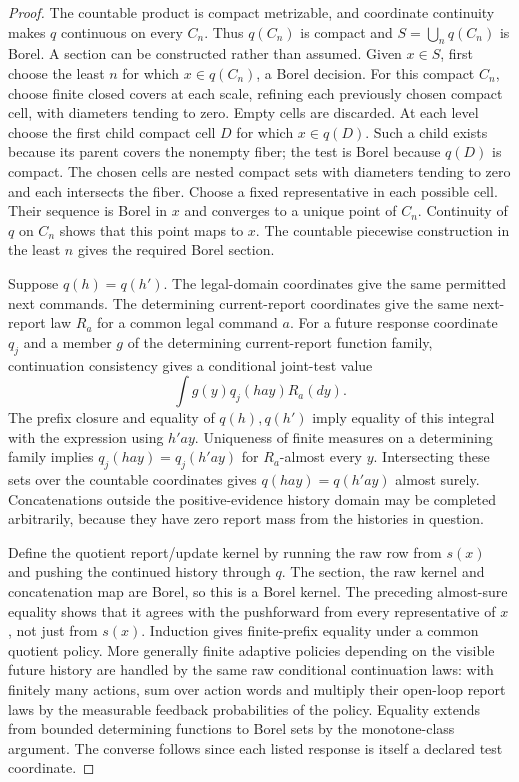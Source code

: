 \begin{proof}
The countable product is compact metrizable, and coordinate continuity makes $q$ continuous on every $C_n$. Thus $q(C_n)$ is compact and $S=\bigcup_nq(C_n)$ is Borel. A section can be constructed rather than assumed. Given $x\in S$, first choose the least $n$ for which $x\in q(C_n)$, a Borel decision. For this compact $C_n$, choose finite closed covers at each scale, refining each previously chosen compact cell, with diameters tending to zero. Empty cells are discarded. At each level choose the first child compact cell $D$ for which $x\in q(D)$. Such a child exists because its parent covers the nonempty fiber; the test is Borel because $q(D)$ is compact. The chosen cells are nested compact sets with diameters tending to zero and each intersects the fiber. Choose a fixed representative in each possible cell. Their sequence is Borel in $x$ and converges to a unique point of $C_n$. Continuity of $q$ on $C_n$ shows that this point maps to $x$. The countable piecewise construction in the least $n$ gives the required Borel section.

Suppose $q(h)=q(h')$. The legal-domain coordinates give the same permitted next commands. The determining current-report coordinates give the same next-report law $R_a$ for a common legal command $a$. For a future response coordinate $q_j$ and a member $g$ of the determining current-report function family, continuation consistency gives a conditional joint-test value
\[
 \int g(y)q_j(hay)R_a(dy).
\]
The prefix closure and equality of $q(h),q(h')$ imply equality of this integral with the expression using $h'ay$. Uniqueness of finite measures on a determining family implies $q_j(hay)=q_j(h'ay)$ for $R_a$-almost every $y$. Intersecting these sets over the countable coordinates gives $q(hay)=q(h'ay)$ almost surely. Concatenations outside the positive-evidence history domain may be completed arbitrarily, because they have zero report mass from the histories in question.

Define the quotient report/update kernel by running the raw row from $s(x)$ and pushing the continued history through $q$. The section, the raw kernel and concatenation map are Borel, so this is a Borel kernel. The preceding almost-sure equality shows that it agrees with the pushforward from every representative of $x$, not just from $s(x)$. Induction gives finite-prefix equality under a common quotient policy. More generally finite adaptive policies depending on the visible future history are handled by the same raw conditional continuation laws: with finitely many actions, sum over action words and multiply their open-loop report laws by the measurable feedback probabilities of the policy. Equality extends from bounded determining functions to Borel sets by the monotone-class argument. The converse follows since each listed response is itself a declared test coordinate.


\end{proof}
